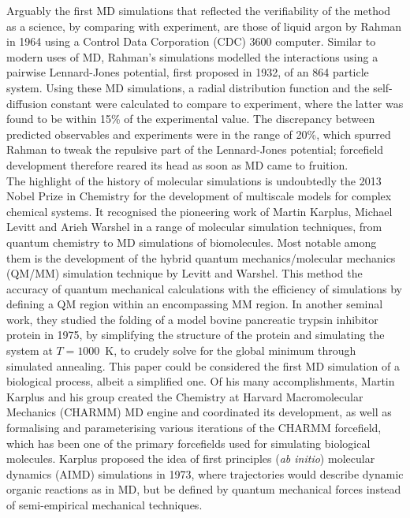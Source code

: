 Arguably the first MD simulations that reflected the verifiability of the method as a science, by comparing with experiment, are those of liquid argon by Rahman in 1964 using a Control Data Corporation (CDC) 3600 computer. Similar to modern uses of MD, Rahman's simulations modelled the interactions using a pairwise Lennard-Jones potential, first proposed in 1932,\cite{lennard1932processes} of an 864 particle system. Using these MD simulations, a radial distribution function and the self-diffusion constant were calculated to compare to experiment, where the latter was found to be within 15\% of the experimental value. The discrepancy between predicted observables and experiments were in the range of 20\%, which spurred Rahman to tweak the repulsive part of the Lennard-Jones potential; forcefield development therefore reared its head as soon as MD came to fruition.\cite{rahman1964correlations}\\

The highlight of the history of molecular simulations is undoubtedly the 2013 Nobel Prize in Chemistry for the development of multiscale models for complex chemical systems. It recognised the pioneering work of Martin Karplus, Michael Levitt and Arieh Warshel in a range of molecular simulation techniques, from quantum chemistry to MD simulations of biomolecules. Most notable among them is the development of the hybrid quantum mechanics/molecular mechanics (QM/MM) simulation technique by Levitt and Warshel.\cite{warshel1976theoretical} This method  the accuracy of quantum mechanical calculations with the efficiency of  simulations by defining a QM region within an encompassing MM region. In another seminal work, they studied the folding of a model bovine pancreatic trypsin inhibitor protein in 1975, by simplifying the structure of the protein and simulating the system at $T=1000$\ K, to crudely solve for the global minimum through simulated annealing. This paper could be considered the first MD simulation of a biological process, albeit a simplified one.\cite{levitt1975computer} Of his many accomplishments, Martin Karplus and his group created the Chemistry at Harvard Macromolecular Mechanics (CHARMM) MD engine and coordinated its development, as well as formalising and parameterising various iterations of the CHARMM forcefield, which has been one of the primary forcefields used for simulating biological molecules.\cite{schmidt1993molecular} Karplus proposed the idea of first principles (\textit{ab initio}) molecular dynamics (AIMD) simulations in 1973, where trajectories would describe dynamic organic reactions as in MD, but be defined by quantum mechanical forces instead of semi-empirical mechanical techniques.\cite{wang1973dyanmics} 

